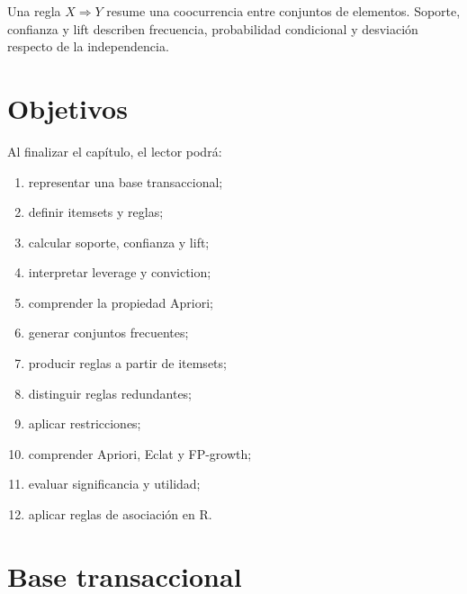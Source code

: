 \documentclass[
  spanish,
  10.5pt,
  letterpaper,
  DIV=11,
  numbers=noendperiod,
  oneside,
  open=any]{scrreprt}
\providecommand{\tightlist}{%
  \setlength{\itemsep}{0pt}\setlength{\parskip}{0pt}}
\theoremstyle{definition}
\theoremstyle{definition}
\theoremstyle{plain}
\theoremstyle{remark}
\begin{document}
\begin{tcolorbox}[enhanced jigsaw, arc=.35mm, bottomrule=.15mm, bottomtitle=1mm, breakable, colback=white, colbacktitle=quarto-callout-important-color!10!white, colframe=quarto-callout-important-color-frame, coltitle=black, left=2mm, leftrule=.75mm, opacityback=0, opacitybacktitle=0.6, rightrule=.15mm, title=\textcolor{quarto-callout-important-color}{\faExclamation}\hspace{0.5em}{Definición esencial}, titlerule=0mm, toprule=.15mm, toptitle=1mm]

Una regla \(X\Rightarrow Y\) resume una coocurrencia entre conjuntos de
elementos. Soporte, confianza y
lift describen frecuencia, probabilidad condicional y
desviación respecto de la independencia.

\end{tcolorbox}

\section*{Objetivos}\label{objetivos-19}


Al finalizar el capítulo, el lector podrá:

\begin{enumerate}
\def\labelenumi{\arabic{enumi}.}
\tightlist
\item
  representar una base transaccional;
\item
  definir itemsets y reglas;
\item
  calcular soporte, confianza y lift;
\item
  interpretar leverage y conviction;
\item
  comprender la propiedad Apriori;
\item
  generar conjuntos frecuentes;
\item
  producir reglas a partir de itemsets;
\item
  distinguir reglas redundantes;
\item
  aplicar restricciones;
\item
  comprender Apriori, Eclat y FP-growth;
\item
  evaluar significancia y utilidad;
\item
  aplicar reglas de asociación en R.
\end{enumerate}

\section*{Base transaccional}\label{base-transaccional}
\end{document}
